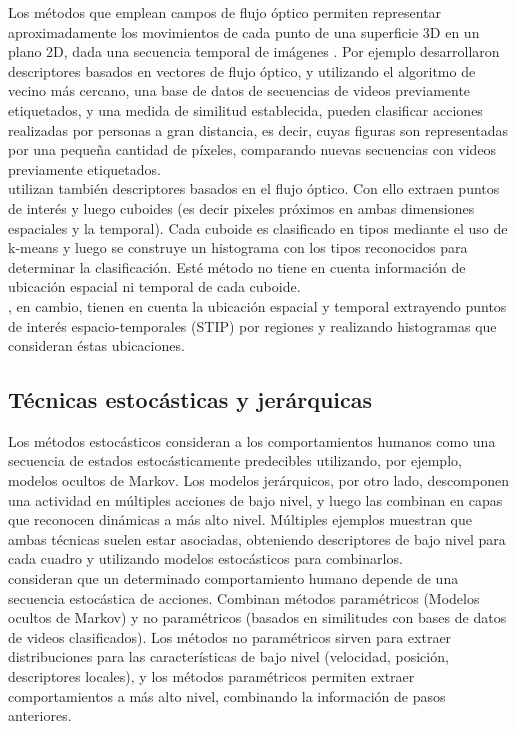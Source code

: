 Los métodos que emplean campos de flujo óptico permiten representar aproximadamente los movimientos de cada punto de una superficie 3D en un plano 2D, dada una secuencia temporal de imágenes \citep{Beauchemin1995}. Por ejemplo \citep{Efros2003} desarrollaron descriptores basados en vectores de flujo óptico, y utilizando el algoritmo de vecino más cercano, una base de datos de secuencias de videos previamente etiquetados, y una medida de similitud establecida, pueden clasificar acciones realizadas por personas a gran distancia, es decir, cuyas figuras son representadas por una pequeña cantidad de píxeles, comparando nuevas secuencias con videos previamente etiquetados. \\

\citep{Dollar2005} utilizan también descriptores basados en el flujo óptico. Con ello extraen puntos de interés y luego cuboides (es decir pixeles próximos en ambas dimensiones espaciales y la temporal). Cada cuboide es clasificado en tipos mediante el uso de k-means y luego se construye un histograma con los tipos reconocidos para determinar la clasificación. Esté método no tiene en cuenta información de ubicación espacial ni temporal de cada cuboide. \\

\citep{Yan2012}, en cambio, tienen en cuenta la ubicación espacial y temporal extrayendo puntos de interés espacio-temporales (STIP) por regiones y realizando histogramas que consideran éstas ubicaciones.

\subsection{Técnicas estocásticas y jerárquicas}

Los métodos estocásticos consideran a los comportamientos humanos como una secuencia de estados estocásticamente predecibles utilizando, por ejemplo, modelos ocultos de Markov. Los modelos jerárquicos, por otro lado, descomponen una actividad en múltiples acciones de bajo nivel, y luego las combinan en capas que reconocen dinámicas a más alto nivel. Múltiples ejemplos muestran que ambas técnicas suelen estar asociadas, obteniendo descriptores de bajo nivel para cada cuadro y utilizando modelos estocásticos para combinarlos. \\

\citep{Robertson2006} consideran que un determinado comportamiento humano depende de una secuencia estocástica de acciones. Combinan métodos paramétricos (Modelos ocultos de Markov) y no paramétricos (basados en similitudes con bases de datos de videos clasificados). Los métodos no paramétricos sirven para extraer distribuciones para las características de bajo nivel (velocidad, posición, descriptores locales), y los métodos paramétricos permiten extraer comportamientos a más alto nivel, combinando la información de pasos anteriores. \\

